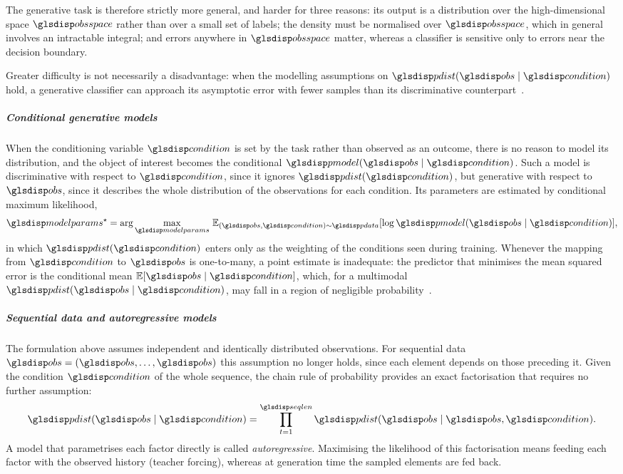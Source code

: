 \documentclass[12pt]{report}
\begin{document}
The generative task is therefore strictly more general, and harder for three reasons: its output is a distribution over the high-dimensional space $\sym{obsspace}$ rather than over a small set of labels; the density must be normalised over $\sym{obsspace}$, which in general involves an intractable integral; and errors anywhere in $\sym{obsspace}$ matter, whereas a classifier is sensitive only to errors near the decision boundary.

Greater difficulty is not necessarily a disadvantage: when the modelling assumptions on $\sym{pdist}(\sym{obs} \mid \sym{condition})$ hold, a generative classifier can approach its asymptotic error with fewer samples than its discriminative counterpart~\cite{ng2002discriminative}.

\subparagraph{Conditional generative models}
When the conditioning variable $\sym{condition}$ is set by the task rather than observed as an outcome, there is no reason to model its distribution, and the object of interest becomes the conditional $\sym{pmodel}(\sym{obs} \mid \sym{condition})$. Such a model is discriminative with respect to $\sym{condition}$, since it ignores $\sym{pdist}(\sym{condition})$, but generative with respect to $\sym{obs}$, since it describes the whole distribution of the observations for each condition. Its parameters are estimated by conditional maximum likelihood,
\begin{equation}
    \sym{modelparams}^\star = \arg\max_{\sym{modelparams}}\, \mathbb{E}_{(\sym{obs}, \sym{condition}) \sim \sym{pdata}}[\log \sym{pmodel}(\sym{obs} \mid \sym{condition})],
\end{equation}
in which $\sym{pdist}(\sym{condition})$ enters only as the weighting of the conditions seen during training. Whenever the mapping from $\sym{condition}$ to $\sym{obs}$ is one-to-many, a point estimate is inadequate: the predictor that minimises the mean squared error is the conditional mean $\mathbb{E}[\sym{obs} \mid \sym{condition}]$, which, for a multimodal $\sym{pdist}(\sym{obs} \mid \sym{condition})$, may fall in a region of negligible probability~\cite[§5.6]{bishop2006pattern}.

\subparagraph{Sequential data and autoregressive models}
The formulation above assumes independent and identically distributed observations. For sequential data $\sym{obs}_{1:\sym*{seqlen}} = (\sym{obs}_1, \dots, \sym{obs}_{\sym*{seqlen}})$ this assumption no longer holds, since each element depends on those preceding it. Given the condition $\sym{condition}$ of the whole sequence, the chain rule of probability provides an exact factorisation that requires no further assumption:
\begin{equation}
    \sym{pdist}(\sym{obs}_{1:\sym*{seqlen}} \mid \sym{condition}) = \prod_{t=1}^{\sym{seqlen}} \sym{pdist}(\sym{obs}_t \mid \sym{obs}_{<t}, \sym{condition}).
\end{equation}
A model that parametrises each factor directly is called \emph{autoregressive}. Maximising the likelihood of this factorisation means feeding each factor with the observed history (teacher forcing), whereas at generation time the sampled elements are fed back.
\end{document}
